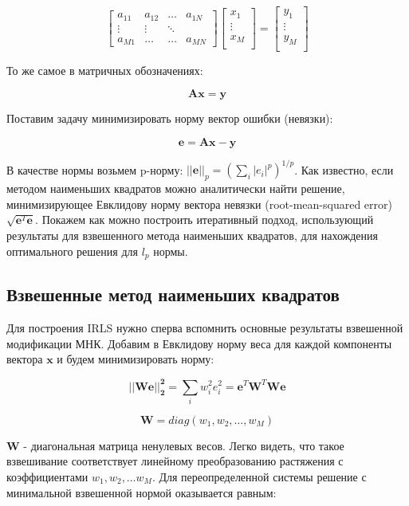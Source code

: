 {\[ \begin{bmatrix} 
    a_{11} & a_{12} & \dots  & a_{1N} \\
    \vdots & \vdots & \ddots & \\
    a_{M1} & \dots  & \dots  & a_{MN}
\end{bmatrix} \begin{bmatrix} 
    x_{1} \\
    \vdots \\
    x_{M} \\ 
\end{bmatrix}
=
\begin{bmatrix} 
    y_{1} \\
    \vdots \\
    y_{M} \\
\end{bmatrix} \]

То же самое в матричных обозначениях:

\[
    \boldsymbol{A} \boldsymbol{x} = \boldsymbol{y}
\]

Поставим задачу минимизировать норму вектор ошибки (невязки):

\[
    \boldsymbol{e} = \boldsymbol{A} \boldsymbol{x} - \boldsymbol{y} 
\]

В качестве нормы возьмем p-норму: $||\boldsymbol{e}||_p = \left( \sum_i |e_i|^p \right)^{1/p}$. Как известно, если методом наименьших квадратов можно аналитически найти решение, минимизирующее Евклидову норму вектора невязки (root-mean-squared error) $\sqrt{\boldsymbol{e}^T \boldsymbol{e}}$. Покажем как можно построить итеративный подход, использующий результаты для взвешенного метода наименьших квадратов, для нахождения оптимального решения для $l_p$ нормы.

\subsection{Взвешенные метод наименьших квадратов}

Для построения IRLS нужно сперва вспомнить основные результаты взвешенной модификации МНК. Добавим в Евклидову норму веса для каждой компоненты вектора $\boldsymbol{x}$ и будем минимизировать норму:

\[
    \boldsymbol{||W e||_2^2} = \sum_i w_i^2 e_i^2 = \boldsymbol{e}^T \boldsymbol{W}^T \boldsymbol{W} \boldsymbol{e} 
\]

\[
    \boldsymbol{W} = diag(w_1, w_2, \dots, w_M)
\]

$\boldsymbol{W}$ - диагональная матрица ненулевых весов. Легко видеть, что такое взвешивание соответствует линейному преобразованию растяжения с коэффициентами $w_1, w_2, \dots w_M$. Для переопределенной системы решение с минимальной взвешенной нормой оказывается равным:

}
